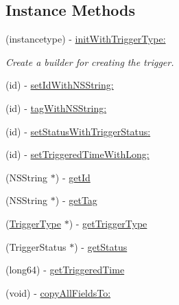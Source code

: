 \subsection*{Instance Methods}
\begin{DoxyCompactItemize}
\item 
(instancetype) -\/ \hyperlink{interface_base_trigger___base_trigger_builder_abeb9c6516317594334b53fb3b49fa7a9}{init\+With\+Trigger\+Type\+:}
\begin{DoxyCompactList}\small\item\em Create a builder for creating the trigger. \end{DoxyCompactList}\item 
(id) -\/ \hyperlink{interface_base_trigger___base_trigger_builder_a1230b8ca5d712cb7d433e7fda736adf7}{set\+Id\+With\+N\+S\+String\+:}
\item 
(id) -\/ \hyperlink{interface_base_trigger___base_trigger_builder_af5bad961fb608bfadb3b64d686c6d56f}{tag\+With\+N\+S\+String\+:}
\item 
(id) -\/ \hyperlink{interface_base_trigger___base_trigger_builder_a8b8608c986332a4cfb0cdf15ba0f7eb6}{set\+Status\+With\+Trigger\+Status\+:}
\item 
(id) -\/ \hyperlink{interface_base_trigger___base_trigger_builder_aecc0f1e27c53e6b234bd1892ff5c76fe}{set\+Triggered\+Time\+With\+Long\+:}
\item 
(N\+S\+String $\ast$) -\/ \hyperlink{interface_base_trigger___base_trigger_builder_a8632e7319dda35f748c21d506bf4ae06}{get\+Id}
\item 
(N\+S\+String $\ast$) -\/ \hyperlink{interface_base_trigger___base_trigger_builder_a3d11cc7f621f2b5e426ea86d11f717c6}{get\+Tag}
\item 
(\hyperlink{interface_trigger_type}{Trigger\+Type} $\ast$) -\/ \hyperlink{interface_base_trigger___base_trigger_builder_a9f3e62cb7b6fdaa25a7d12d937a6182a}{get\+Trigger\+Type}
\item 
(Trigger\+Status $\ast$) -\/ \hyperlink{interface_base_trigger___base_trigger_builder_a36fb5c02fb6f5deadf64a88225529e1d}{get\+Status}
\item 
(long64) -\/ \hyperlink{interface_base_trigger___base_trigger_builder_a6d8662268abb435439e44f725c916fcc}{get\+Triggered\+Time}
\item 
(void) -\/ \hyperlink{interface_base_trigger___base_trigger_builder_a32dfc9a198490bbe51285deff75c1fdd}{copy\+All\+Fields\+To\+:}
\end{DoxyCompactItemize}
